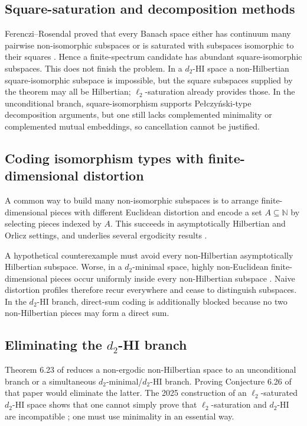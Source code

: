 \documentclass[11pt]{article}
\theoremstyle{definition}
\theoremstyle{remark}
\newcommand{\ellTwo}{\ell_2}
\newcommand{\N}{\mathbb N}
\begin{document}
\subsection{Square-saturation and decomposition methods}

Ferenczi--Rosendal proved that every Banach space either has continuum many pairwise non-isomorphic subspaces or is saturated with subspaces isomorphic to their squares \cite[Corollary 14]{FRnumber}.  Hence a finite-spectrum candidate has abundant square-isomorphic subspaces.  This does not finish the problem.  In a \(d_2\)-HI space a non-Hilbertian square-isomorphic subspace is impossible, but the square subspaces supplied by the theorem may all be Hilbertian; \(\ellTwo\)-saturation already provides those.  In the unconditional branch, square-isomorphism supports Pe\l czy\'nski-type decomposition arguments, but one still lacks complemented minimality or complemented mutual embeddings, so cancellation cannot be justified.

\subsection{Coding isomorphism types with finite-dimensional distortion}

A common way to build many non-isomorphic subspaces is to arrange finite-dimensional pieces with different Euclidean distortion and encode a set \(A\subseteq\N\) by selecting pieces indexed by \(A\).  This succeeds in asymptotically Hilbertian and Orlicz settings, and underlies several ergodicity results \cite{Anisca2010,dRK2026}.

A hypothetical counterexample must avoid every non-Hilbertian asymptotically Hilbertian subspace.  Worse, in a \(d_2\)-minimal space, highly non-Euclidean finite-dimensional pieces occur uniformly inside every non-Hilbertian subspace \cite[Lemma 6.14]{CCRF2023}.  Naive distortion profiles therefore recur everywhere and cease to distinguish subspaces.  In the \(d_2\)-HI branch, direct-sum coding is additionally blocked because no two non-Hilbertian pieces may form a direct sum.

\subsection{Eliminating the \texorpdfstring{\(d_2\)}{d2}-HI branch}

Theorem 6.23 of \cite{CCRF2023} reduces a non-ergodic non-Hilbertian space to an unconditional branch or a simultaneous \(d_2\)-minimal/\(d_2\)-HI branch.  Proving Conjecture 6.26 of that paper would eliminate the latter.  The 2025 construction of an \(\ellTwo\)-saturated \(d_2\)-HI space shows that one cannot simply prove that \(\ellTwo\)-saturation and \(d_2\)-HI are incompatible \cite{AMM2025}; one must use minimality in an essential way.
\end{document}
